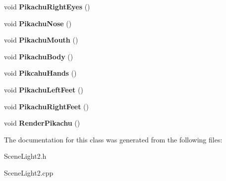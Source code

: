 \begin{DoxyCompactItemize}
\item 
\hypertarget{class_scene_light2_a88811d659896d67c8a52ec7e0b96975a}{void {\bfseries Pikachu\+Right\+Eyes} ()}\label{class_scene_light2_a88811d659896d67c8a52ec7e0b96975a}

\item 
\hypertarget{class_scene_light2_ad143d1b59479c64219d13de05f35f006}{void {\bfseries Pikachu\+Nose} ()}\label{class_scene_light2_ad143d1b59479c64219d13de05f35f006}

\item 
\hypertarget{class_scene_light2_ae5966f852fc393928c3ef0536c6b5ffb}{void {\bfseries Pikachu\+Mouth} ()}\label{class_scene_light2_ae5966f852fc393928c3ef0536c6b5ffb}

\item 
\hypertarget{class_scene_light2_abf145d7167eb753a5ecef20242791a81}{void {\bfseries Pikachu\+Body} ()}\label{class_scene_light2_abf145d7167eb753a5ecef20242791a81}

\item 
\hypertarget{class_scene_light2_a57086f8344bfeee2f870477046adfa7c}{void {\bfseries Pikcahu\+Hands} ()}\label{class_scene_light2_a57086f8344bfeee2f870477046adfa7c}

\item 
\hypertarget{class_scene_light2_ab2ee028987e6b35ed71b8eaae048587f}{void {\bfseries Pikachu\+Left\+Feet} ()}\label{class_scene_light2_ab2ee028987e6b35ed71b8eaae048587f}

\item 
\hypertarget{class_scene_light2_a881484d5b6fc51adc2fcce919cd46f0a}{void {\bfseries Pikachu\+Right\+Feet} ()}\label{class_scene_light2_a881484d5b6fc51adc2fcce919cd46f0a}

\item 
\hypertarget{class_scene_light2_ab39556c22242e92847084ad385b454be}{void {\bfseries Render\+Pikachu} ()}\label{class_scene_light2_ab39556c22242e92847084ad385b454be}

\end{DoxyCompactItemize}


The documentation for this class was generated from the following files\+:\begin{DoxyCompactItemize}
\item 
Scene\+Light2.\+h\item 
Scene\+Light2.\+cpp\end{DoxyCompactItemize}
